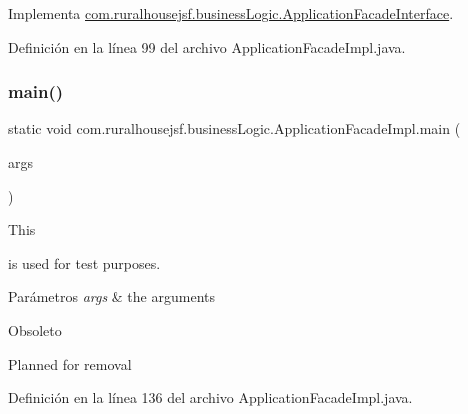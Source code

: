 Implementa \mbox{\hyperlink{interfacecom_1_1ruralhousejsf_1_1business_logic_1_1_application_facade_interface_a75cc2d20f7df7b8872333cca281bf343}{com.\+ruralhousejsf.\+business\+Logic.\+Application\+Facade\+Interface}}.



Definición en la línea 99 del archivo Application\+Facade\+Impl.\+java.

\mbox{\label{classcom_1_1ruralhousejsf_1_1business_logic_1_1_application_facade_impl_a19d9b0706fe39437efc379c3bc747e06}} 
\subsubsection{\texorpdfstring{main()}{main()}}
{\footnotesize\ttfamily static void com.\+ruralhousejsf.\+business\+Logic.\+Application\+Facade\+Impl.\+main (\begin{DoxyParamCaption}\item[{String \mbox{[}$\,$\mbox{]}}]{args }\end{DoxyParamCaption})\hspace{0.3cm}{\ttfamily [static]}}

This
\begin{DoxyCode}{0}
\end{DoxyCode}
 is used for test purposes.


\begin{DoxyParams}{Parámetros}
{\em args} & the arguments\\
\hline
\end{DoxyParams}
\begin{DoxyRefDesc}{Obsoleto}
\item[\mbox{\hyperlink{deprecated__deprecated000001}{Obsoleto}}]Planned for removal \end{DoxyRefDesc}


Definición en la línea 136 del archivo Application\+Facade\+Impl.\+java.

\mbox{\label{classcom_1_1ruralhousejsf_1_1business_logic_1_1_application_facade_impl_a78fc6968b9fec7aa475b322463b6bd92}} 
